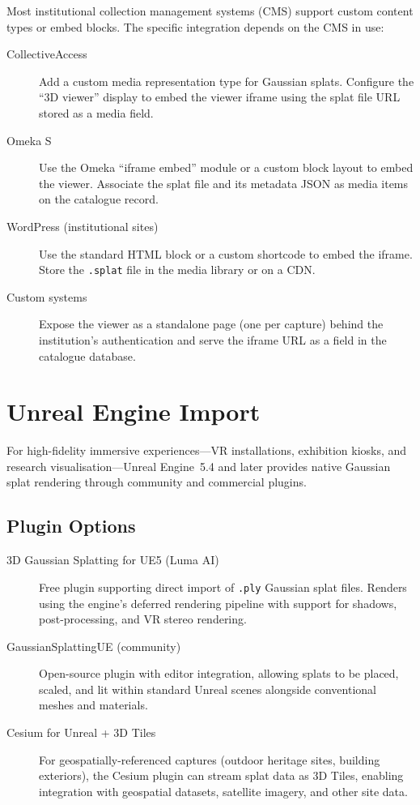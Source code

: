 Most institutional collection management systems (CMS) support custom content types or embed blocks. The specific integration depends on the CMS in use:

\begin{description}
  \item[CollectiveAccess] Add a custom media representation type for Gaussian splats. Configure the ``3D viewer'' display to embed the viewer iframe using the splat file URL stored as a media field.
  \item[Omeka S] Use the Omeka ``iframe embed'' module or a custom block layout to embed the viewer. Associate the splat file and its metadata JSON as media items on the catalogue record.
  \item[WordPress (institutional sites)] Use the standard HTML block or a custom shortcode to embed the iframe. Store the \texttt{.splat} file in the media library or on a CDN.
  \item[Custom systems] Expose the viewer as a standalone page (one per capture) behind the institution's authentication and serve the iframe URL as a field in the catalogue database.
\end{description}

\section{Unreal Engine Import}
\label{sec:view-unreal}

For high-fidelity immersive experiences---VR installations, exhibition kiosks, and research visualisation---Unreal Engine~5.4 and later provides native Gaussian splat rendering through community and commercial plugins.

\subsection{Plugin Options}

\begin{description}
  \item[3D Gaussian Splatting for UE5 (Luma AI)] Free plugin supporting direct import of \texttt{.ply} Gaussian splat files. Renders using the engine's deferred rendering pipeline with support for shadows, post-processing, and VR stereo rendering.
  \item[GaussianSplattingUE (community)] Open-source plugin with editor integration, allowing splats to be placed, scaled, and lit within standard Unreal scenes alongside conventional meshes and materials.
  \item[Cesium for Unreal + 3D Tiles] For geospatially-referenced captures (outdoor heritage sites, building exteriors), the Cesium plugin can stream splat data as 3D Tiles, enabling integration with geospatial datasets, satellite imagery, and other site data.
\end{description}

